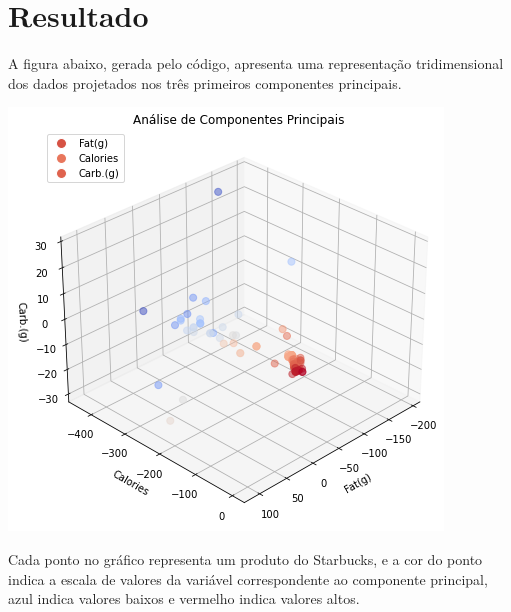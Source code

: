 \documentclass[12pt,a4]{article}
\begin{document}
\newpage
\section{Resultado}
A figura abaixo, gerada pelo código, apresenta uma representação tridimensional dos dados projetados nos três primeiros componentes principais.

\begin{center}
    \includegraphics[scale=0.9]{1.png}
\end{center}

\begin{flushleft}
Cada ponto no gráfico representa um produto do Starbucks, e a cor do ponto indica a escala de valores da variável correspondente ao componente principal, azul indica valores baixos e vermelho indica valores altos.
\end{flushleft}
\end{document}
